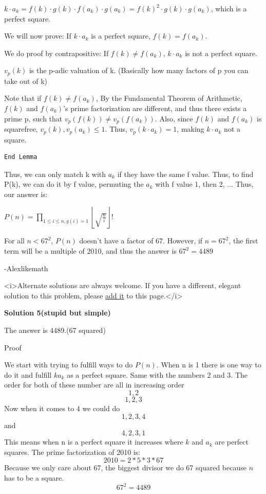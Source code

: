 \begin{enumerate}
 $k \cdot a_k = f(k) \cdot g(k) \cdot f(a_k) \cdot g(a_k) = f(k)^2 \cdot g(k) \cdot g(a_k)$, which is a perfect square. 

 We will now prove: If $k \cdot a_k$ is a perfect square, $f(k) = f(a_k)$.

 We do proof by contrapositive: If $f(k) \neq f(a_k)$, $k \cdot a_k$ is not a perfect square. 

 $v_p(k)$ is the p-adic valuation of k. (Basically how many factors of p you can take out of k)

 Note that if $f(k) \neq f(a_k)$, By the Fundamental Theorem of Arithmetic, $f(k)$ and $f(a_k)$'s prime factorization are different, and thus there exists a prime p, such that $v_p(f(k)) \neq v_p(f(a_k))$. Also, since $f(k)$ and $f(a_k)$ is squarefree, $v_p(k), v_p(a_k) \leq 1$. Thus, $v_p(k \cdot a_k) = 1$, making $k \cdot a_k$ not a square.

 \begin{verbatim}
End Lemma
\end{verbatim}

Thus, we can only match k with $a_k$ if they have the same f value. Thus, to find P(k), we can do it by f value, permuting the $a_k$ with f value 1, then 2, ... Thus, our answer is:

 $P(n) = \prod_{1 \leq i \leq n, g(i) = 1} \left\lfloor \sqrt{\frac{n}{i}} \right \rfloor !$ 

 For all $n < 67^2$, $P(n)$ doesn't have a factor of 67. However, if $n = 67^2$, the first term will be a multiple of 2010, and thus the answer is $67^2 = \boxed{4489}$

 -Alexlikemath

 
<i>Alternate solutions are always welcome. If you have a different, elegant solution to this problem, please \href{https://artofproblemsolving.com/wiki/index.php?title=2010\_USAJMO\_Problems/Problem\_1&action=edit}{add it} to this page.</i>




\textbf{Solution 5(stupid but simple)}

The answer is 4489.(67 squared)

 Proof

 We start with trying to fulfill ways to do $P(n)$. When n is 1 there is one way to do it and fulfill $ka_k$ as a perfect square. Same with the numbers 2 and 3. The order for both of these number are all in increasing order 
 \[1,2\] 
 \[1,2,3\] Now when it comes to 4 we could do 
 \[1,2,3,4\] and 
 \[4,2,3,1\] This means when n is a perfect square it increases where $k$ and $a_k$ are perfect squares. The prime factorization of 2010 is: 
 \[2010=2*5*3*67\] Because we only care about 67, the biggest divisor we do 67 squared because $n$ has to be a square.
 \[67^2=4489\] 


\end{enumerate}
